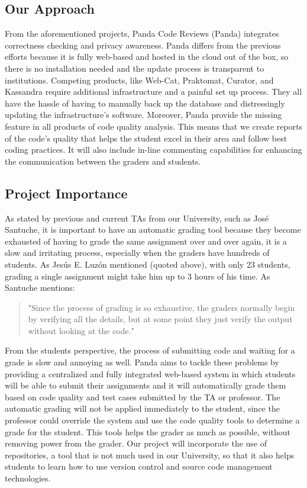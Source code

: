 
\subsection{Our Approach}

From the aforementioned projects, Panda Code Reviews (Panda) integrates
correctness checking and privacy awareness. Panda differs from the previous
efforts because it is fully web-based and hosted in the cloud out of the box, so
there is no installation needed and the update process is transparent to
institutions. Competing products, like Web-Cat, Praktomat, Curator, and
Kassandra require additional infrastructure and a painful set up process. They
all have the hassle of having to manually back up the database and distressingly
updating the infrastructure's software. Moreover, Panda provide the missing
feature in all products of code quality analysis. This means that we create
reports of the code's quality that helps the student excel in their area and
follow best coding practices. It will also include in-line commenting
capabilities for enhancing the communication between the graders and students.

\subsection{Project Importance}

As stated by previous and current TAs from our University, such as José
Santuche, it is important to have an automatic grading tool because they become
exhausted of having to grade the same assignment over and over again, it is a
slow and irritating process, especially when the graders have hundreds of
students. As Jesús E. Luzón mentioned (quoted above), with only 23 students,
grading a single assignment might take him up to 3 hours of his time. As
Santuche mentions: \begin{quote} "Since the process of grading is so exhaustive,
the graders normally begin by verifying all the details, but at some point they
just verify the output without looking at the code." \end{quote} From the
students perspective, the process of submitting code and waiting for a grade is
slow and annoying as well. Panda aims to tackle these problems by providing a
centralized and fully integrated web-based system in which students will be able
to submit their assignments and it will automatically grade them based on code
quality and test cases submitted by the TA or professor. The automatic grading
will not be applied immediately to the student, since the professor could
override the system and use the code quality tools to determine a grade for the
student. This tools helps the grader as much as possible, without removing power
from the grader. Our project will incorporate the use of repositories, a tool
that is not much used in our University, so that it also helps students to learn
how to use version control and source code management technologies.

